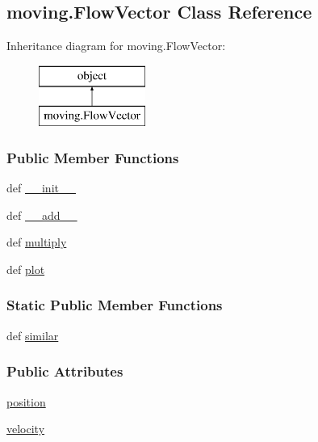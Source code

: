 \hypertarget{classmoving_1_1FlowVector}{\subsection{moving.\-Flow\-Vector Class Reference}
\label{classmoving_1_1FlowVector}
}
Inheritance diagram for moving.\-Flow\-Vector\-:\begin{figure}[H]
\begin{center}
\leavevmode
\includegraphics[height=2.000000cm]{classmoving_1_1FlowVector}
\end{center}
\end{figure}
\subsubsection*{Public Member Functions}
\begin{DoxyCompactItemize}
\item 
def \hyperlink{classmoving_1_1FlowVector_ab002fb0e01fd32d939cf6d9ecca12aaa}{\-\_\-\-\_\-init\-\_\-\-\_\-}
\item 
def \hyperlink{classmoving_1_1FlowVector_affd5d19b9c1df9240ec735d2bcf8c354}{\-\_\-\-\_\-add\-\_\-\-\_\-}
\item 
def \hyperlink{classmoving_1_1FlowVector_aec4763f51be2170c567c9d672ea12fb6}{multiply}
\item 
def \hyperlink{classmoving_1_1FlowVector_aa546a09abbbc265ed0ca43851c8e3ab7}{plot}
\end{DoxyCompactItemize}
\subsubsection*{Static Public Member Functions}
\begin{DoxyCompactItemize}
\item 
def \hyperlink{classmoving_1_1FlowVector_af8e4e987cb66de6ee60fb05a9a6dda4a}{similar}
\end{DoxyCompactItemize}
\subsubsection*{Public Attributes}
\begin{DoxyCompactItemize}
\item 
\hyperlink{classmoving_1_1FlowVector_a79d88d430e5b2e1d6aede942fa770348}{position}
\item 
\hyperlink{classmoving_1_1FlowVector_a91a16e07333e7e972c432d36324f2bce}{velocity}
\end{DoxyCompactItemize}



